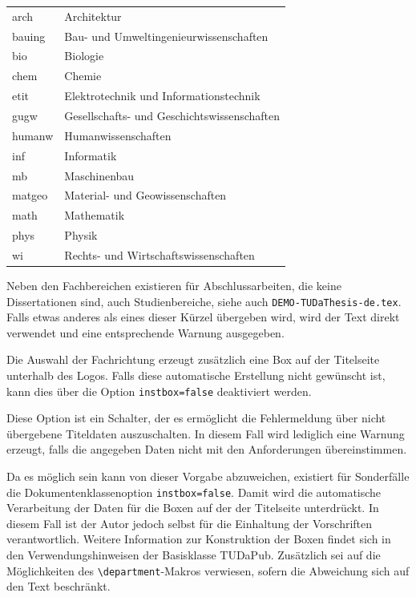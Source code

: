 \documentclass[
	ngerman,%
	accentcolor=9c,%
	ruledheaders=chapter,%
	class=book,%
	thesis={%
		type=dr,
		dr=rernat
	},
	fontsize=11pt,%
	parskip=half-,%
	custommargins=true,%
	marginpar=false,%
]{tudapub}
\newcommand*{\file}[1]{\texttt{#1}}
\newcommand*{\code}[1]{\texttt{#1}}
\begin{document}
\begin{description}
	      \begin{tabular}{@{}l@{${}\to{}$}l@{}}
		      arch  & Architektur\\
		      bauing& Bau- und Umweltingenieurwissenschaften\\
		      bio   &Biologie\\
		      chem  &Chemie\\
		      etit  &Elektrotechnik und Informationstechnik\\
		      gugw  &Gesellschafts- und Geschichtswissenschaften\\
		      humanw&Humanwissenschaften\\
		      inf   &Informatik\\
		      mb    &Maschinenbau\\
		      matgeo&Material- und Geowissenschaften\\
		      math  &Mathematik\\
		      phys  &Physik\\
		      wi    &Rechts- und Wirtschaftswissenschaften
	      \end{tabular}

	      Neben den Fachbereichen existieren für Abschlussarbeiten, die keine Dissertationen sind, auch Studienbereiche, siehe auch \file{DEMO-TUDaThesis-de.tex}.
	      Falls etwas anderes als eines dieser Kürzel übergeben wird, wird der Text direkt verwendet und eine entsprechende Warnung ausgegeben.

	      Die Auswahl der Fachrichtung erzeugt zusätzlich eine Box auf der Titelseite unterhalb des Logos. Falls diese automatische Erstellung nicht gewünscht ist, kann dies über die Option \code{instbox=false} deaktiviert werden.
	\item[ignore-missing-data] Diese Option ist ein Schalter, der es ermöglicht die Fehlermeldung über nicht übergebene Titeldaten auszuschalten. In diesem Fall wird lediglich eine Warnung erzeugt, falls die angegeben Daten nicht mit den Anforderungen übereinstimmen.
\end{description}

Da es möglich sein kann von dieser Vorgabe abzuweichen, existiert für Sonderfälle die Dokumentenklassenoption \code{instbox=false}. Damit wird die automatische Verarbeitung der Daten für die Boxen auf der der Titelseite unterdrückt. In diesem Fall ist der Autor jedoch selbst für die Einhaltung der Vorschriften verantwortlich. Weitere Information zur Konstruktion der Boxen findet sich in den Verwendungshinweisen der Basisklasse TUDaPub. Zusätzlich sei auf die Möglichkeiten des \code{\textbackslash{}department}-Makros verwiesen, sofern die Abweichung sich auf den Text beschränkt.
\end{document}
